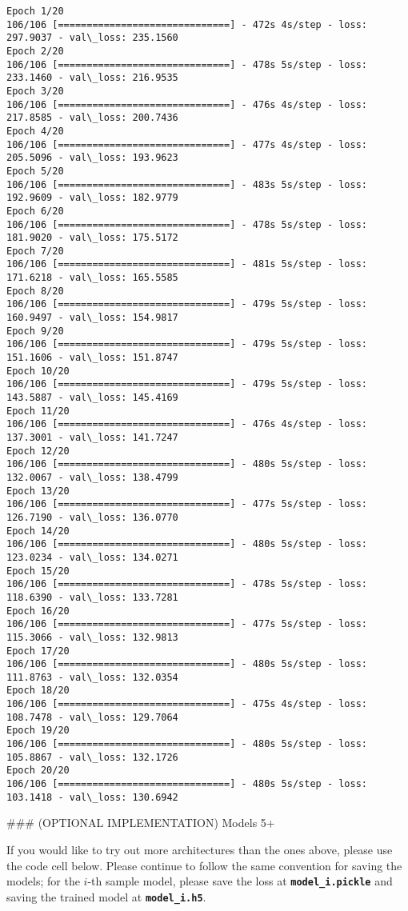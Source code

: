 \documentclass[11pt]{article}
\begin{document}
    \begin{Verbatim}[commandchars=\\\{\}]
Epoch 1/20
106/106 [==============================] - 472s 4s/step - loss: 297.9037 - val\_loss: 235.1560
Epoch 2/20
106/106 [==============================] - 478s 5s/step - loss: 233.1460 - val\_loss: 216.9535
Epoch 3/20
106/106 [==============================] - 476s 4s/step - loss: 217.8585 - val\_loss: 200.7436
Epoch 4/20
106/106 [==============================] - 477s 4s/step - loss: 205.5096 - val\_loss: 193.9623
Epoch 5/20
106/106 [==============================] - 483s 5s/step - loss: 192.9609 - val\_loss: 182.9779
Epoch 6/20
106/106 [==============================] - 478s 5s/step - loss: 181.9020 - val\_loss: 175.5172
Epoch 7/20
106/106 [==============================] - 481s 5s/step - loss: 171.6218 - val\_loss: 165.5585
Epoch 8/20
106/106 [==============================] - 479s 5s/step - loss: 160.9497 - val\_loss: 154.9817
Epoch 9/20
106/106 [==============================] - 479s 5s/step - loss: 151.1606 - val\_loss: 151.8747
Epoch 10/20
106/106 [==============================] - 479s 5s/step - loss: 143.5887 - val\_loss: 145.4169
Epoch 11/20
106/106 [==============================] - 476s 4s/step - loss: 137.3001 - val\_loss: 141.7247
Epoch 12/20
106/106 [==============================] - 480s 5s/step - loss: 132.0067 - val\_loss: 138.4799
Epoch 13/20
106/106 [==============================] - 477s 5s/step - loss: 126.7190 - val\_loss: 136.0770
Epoch 14/20
106/106 [==============================] - 480s 5s/step - loss: 123.0234 - val\_loss: 134.0271
Epoch 15/20
106/106 [==============================] - 478s 5s/step - loss: 118.6390 - val\_loss: 133.7281
Epoch 16/20
106/106 [==============================] - 477s 5s/step - loss: 115.3066 - val\_loss: 132.9813
Epoch 17/20
106/106 [==============================] - 480s 5s/step - loss: 111.8763 - val\_loss: 132.0354
Epoch 18/20
106/106 [==============================] - 475s 4s/step - loss: 108.7478 - val\_loss: 129.7064
Epoch 19/20
106/106 [==============================] - 480s 5s/step - loss: 105.8867 - val\_loss: 132.1726
Epoch 20/20
106/106 [==============================] - 480s 5s/step - loss: 103.1418 - val\_loss: 130.6942

    \end{Verbatim}

     \#\#\# (OPTIONAL IMPLEMENTATION) Models 5+

If you would like to try out more architectures than the ones above,
please use the code cell below. Please continue to follow the same
convention for saving the models; for the \(i\)-th sample model, please
save the loss at \textbf{\texttt{model\_i.pickle}} and saving the
trained model at \textbf{\texttt{model\_i.h5}}.
\end{document}
